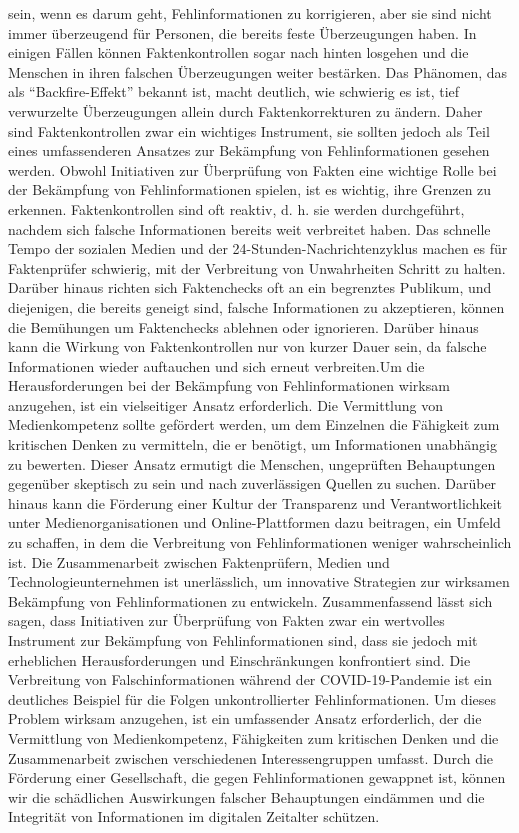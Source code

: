 \documentclass[a4paper,listof=totoc,bibliography=totoc]{scrartcl}
\begin{document}
sein, wenn es darum geht, Fehlinformationen zu korrigieren, aber sie sind nicht immer überzeugend für Personen, die bereits feste Überzeugungen haben. In 
einigen Fällen können Faktenkontrollen sogar nach hinten losgehen und die Menschen in ihren falschen Überzeugungen weiter bestärken. Das Phänomen, das als 
``Backfire-Effekt'' bekannt ist, macht deutlich, wie schwierig es ist, tief verwurzelte Überzeugungen allein durch Faktenkorrekturen zu ändern. Daher sind 
Faktenkontrollen zwar ein wichtiges Instrument, sie sollten jedoch als Teil eines umfassenderen Ansatzes zur Bekämpfung von Fehlinformationen gesehen werden.
Obwohl Initiativen zur Überprüfung von Fakten eine wichtige Rolle bei der Bekämpfung von Fehlinformationen spielen, ist es wichtig, ihre Grenzen zu erkennen.
\newline
\newline
Faktenkontrollen sind oft reaktiv, d. h. sie werden durchgeführt, nachdem sich falsche Informationen bereits weit verbreitet haben. Das schnelle Tempo der 
sozialen Medien und der 24-Stunden-Nachrichtenzyklus machen es für Faktenprüfer schwierig, mit der Verbreitung von Unwahrheiten Schritt zu halten. Darüber 
hinaus richten sich Faktenchecks oft an ein begrenztes Publikum, und diejenigen, die bereits geneigt sind, falsche Informationen zu akzeptieren, können die 
Bemühungen um Faktenchecks ablehnen oder ignorieren. Darüber hinaus kann die Wirkung von Faktenkontrollen nur von kurzer Dauer sein, da falsche Informationen 
wieder auftauchen und sich erneut verbreiten.Um die Herausforderungen bei der Bekämpfung von Fehlinformationen wirksam anzugehen, ist ein vielseitiger Ansatz 
erforderlich. Die Vermittlung von Medienkompetenz sollte gefördert werden, um dem Einzelnen die Fähigkeit zum kritischen Denken zu vermitteln, die er benötigt, 
um Informationen unabhängig zu bewerten. Dieser Ansatz ermutigt die Menschen, ungeprüften Behauptungen gegenüber skeptisch zu sein und nach zuverlässigen Quellen 
zu suchen. Darüber hinaus kann die Förderung einer Kultur der Transparenz und Verantwortlichkeit unter Medienorganisationen und Online-Plattformen dazu beitragen, 
ein Umfeld zu schaffen, in dem die Verbreitung von Fehlinformationen weniger wahrscheinlich ist. Die Zusammenarbeit zwischen Faktenprüfern, Medien und Technologieunternehmen 
ist unerlässlich, um innovative Strategien zur wirksamen Bekämpfung von Fehlinformationen zu entwickeln. Zusammenfassend lässt sich sagen, dass Initiativen zur Überprüfung von 
Fakten zwar ein wertvolles Instrument zur Bekämpfung von Fehlinformationen sind, dass sie jedoch mit erheblichen Herausforderungen und Einschränkungen konfrontiert sind. 
Die Verbreitung von Falschinformationen während der COVID-19-Pandemie ist ein deutliches Beispiel für die Folgen unkontrollierter Fehlinformationen. Um dieses Problem 
wirksam anzugehen, ist ein umfassender Ansatz erforderlich, der die Vermittlung von Medienkompetenz, Fähigkeiten zum kritischen Denken und die Zusammenarbeit zwischen 
verschiedenen Interessengruppen umfasst. Durch die Förderung einer Gesellschaft, die gegen Fehlinformationen gewappnet ist, können wir die schädlichen Auswirkungen falscher 
Behauptungen eindämmen und die Integrität von Informationen im digitalen Zeitalter schützen.
\end{document}
